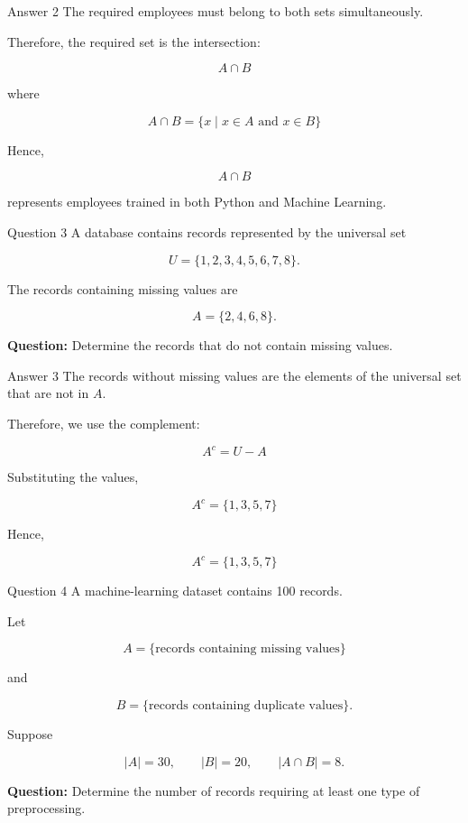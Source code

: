 \begin{frame}{Answer 2}
The required employees must belong to both sets simultaneously.

Therefore, the required set is the intersection:

$$
A\cap B
$$

where

$$
A\cap B
=
\{x\mid x\in A\text{ and }x\in B\}
$$

Hence,

$$
\boxed{A\cap B}
$$

represents employees trained in both Python and Machine Learning.
\end{frame}


\begin{frame}{Question 3}
A database contains records represented by the universal set

$$
U=\{1,2,3,4,5,6,7,8\}.
$$

The records containing missing values are

$$
A=\{2,4,6,8\}.
$$

\textbf{Question:} Determine the records that do not contain missing values.
\end{frame}

\begin{frame}{Answer 3}
The records without missing values are the elements of the universal set that are not in $A$.

Therefore, we use the complement:

$$
A^c=U-A
$$

Substituting the values,

$$
A^c
=
\{1,3,5,7\}
$$

Hence,

$$
\boxed{A^c=\{1,3,5,7\}}
$$

\end{frame}


\begin{frame}{Question 4}
A machine-learning dataset contains 100 records.

Let

$$
A=\{\text{records containing missing values}\}
$$

and

$$
B=\{\text{records containing duplicate values}\}.
$$

Suppose

$$
|A|=30,\qquad |B|=20,\qquad |A\cap B|=8.
$$

\textbf{Question:} Determine the number of records requiring at least one type of preprocessing.
\end{frame}

